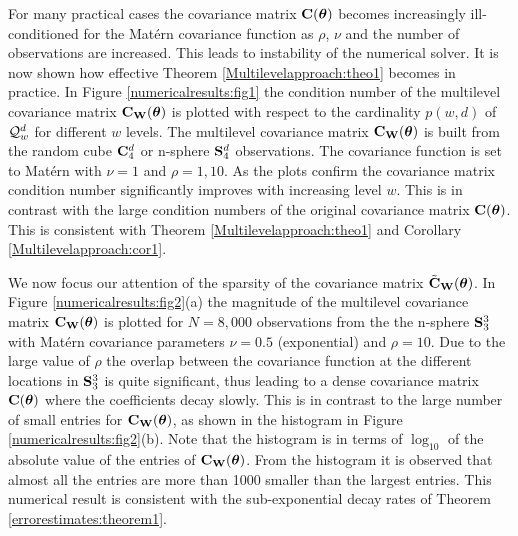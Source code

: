 \documentclass[11pt,final]{amsart}       %
\begin{document}
For many practical cases the covariance matrix $\mathbf{C}(\boldsymbol{\theta})$ becomes
increasingly ill-conditioned for the Mat\'{e}rn covariance function as
$\rho$, $\nu$ and the number of observations are increased. This leads
to instability of the numerical solver. It is now shown how effective
Theorem \ref{Multilevelapproach:theo1} becomes in practice.  In
Figure \ref{numericalresults:fig1} the condition number of the
multilevel covariance matrix $\mathbf{C}_{\mathbf{W}}(\boldsymbol{\theta})$ is plotted with
respect to the cardinality $p(w,d)$ of ${\mathcal Q}^d_w$ for different $w$
levels. The multilevel covariance matrix $\mathbf{C}_{\mathbf{W}}(\boldsymbol{\theta})$ is built
from the random cube $\mathbf{C}^{d}_{4}$ or n-sphere $\mathbf{S}^{d}_{4}$
observations. The covariance function is set to Mat\'{e}rn with $\nu =
1$ and $\rho = 1,10$.  As the plots confirm the covariance matrix
condition number significantly improves with increasing level
$w$. This is in contrast with the large condition numbers of the
original covariance matrix $\mathbf{C}(\boldsymbol{\theta})$.  This is consistent with
Theorem \ref{Multilevelapproach:theo1} and Corollary
\ref{Multilevelapproach:cor1}.


We now focus our attention of the sparsity of the covariance matrix
$\tilde {\mathbf{C}}_{\mathbf{W}}(\boldsymbol{\theta})$. In Figure \ref{numericalresults:fig2}(a)
the magnitude of the multilevel covariance matrix
$\mathbf{C}_{\mathbf{W}}(\boldsymbol{\theta})$ is plotted for $N = 8,000$ observations from the
the n-sphere $\mathbf{S}^{3}_{3}$ with Mat\'{e}rn covariance parameters $\nu
= 0.5$ (exponential) and $\rho = 10$. Due to the large value of $\rho$
the overlap between the covariance function at the different locations
in $\mathbf{S}^{3}_{3}$ is quite significant, thus leading to a dense
covariance matrix $\mathbf{C}(\boldsymbol{\theta})$ where the coefficients decay
slowly. This is in contrast to the large number of small entries for
$\mathbf{C}_{\mathbf{W}}(\boldsymbol{\theta})$, as shown in the histogram in Figure
\ref{numericalresults:fig2}(b). Note that the histogram is in terms of
$\log_{10}$ of the absolute value of the entries of
$\mathbf{C}_{\mathbf{W}}(\boldsymbol{\theta})$. From the histogram it is observed that almost
all the entries are more than 1000 smaller than the largest entries.
This numerical result is consistent with the sub-exponential decay
rates of Theorem \ref{errorestimates:theorem1}.
\end{document}
